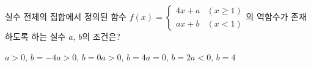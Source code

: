 \hspace*{2mm}\begin{minipage}[t]{\dimexpr\linewidth-2mm\relax}\vspace{0pt}
실수 전체의 집합에서 정의된 함수 $f(x)=\begin{cases} 4x+a & (x\ge 1) \\ ax+b & (x<1) \end{cases}$의 역함수가 존재하도록 하는 실수 $a$, $b$의 조건은?
\begin{choicesii}{$a>0$, $b=-4$}{$a>0$, $b=0$}{$a>0$, $b=4$}{$a=0$, $b=2$}{$a<0$, $b=4$}\end{choicesii}\end{minipage}
